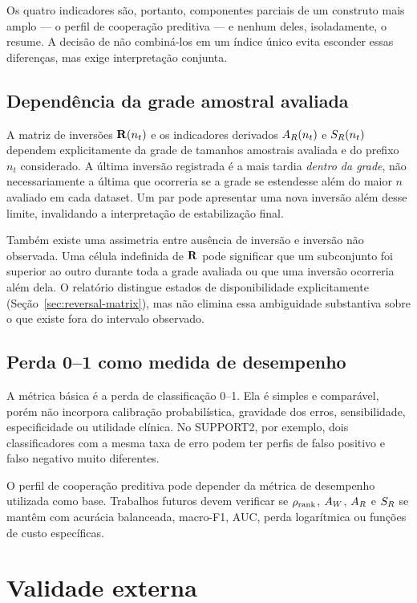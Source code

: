 Os quatro indicadores são, portanto, componentes parciais de um construto mais amplo --- o perfil de cooperação preditiva --- e nenhum deles, isoladamente, o resume. A decisão de não combiná-los em um índice único evita esconder essas diferenças, mas exige interpretação conjunta.

\subsection{Dependência da grade amostral avaliada}

A matriz de inversões $\mathbf{R}(n_t)$ e os indicadores derivados $A_R(n_t)$ e $S_R(n_t)$ dependem explicitamente da grade de tamanhos amostrais avaliada e do prefixo $n_t$ considerado. A última inversão registrada é a mais tardia \emph{dentro da grade}, não necessariamente a última que ocorreria se a grade se estendesse além do maior $n$ avaliado em cada dataset. Um par pode apresentar uma nova inversão além desse limite, invalidando a interpretação de estabilização final.

Também existe uma assimetria entre ausência de inversão e inversão não observada. Uma célula indefinida de $\mathbf{R}$ pode significar que um subconjunto foi superior ao outro durante toda a grade avaliada ou que uma inversão ocorreria além dela. O relatório distingue estados de disponibilidade explicitamente (Seção~\ref{sec:reversal-matrix}), mas não elimina essa ambiguidade substantiva sobre o que existe fora do intervalo observado.

\subsection{Perda 0--1 como medida de desempenho}

A métrica básica é a perda de classificação 0--1. Ela é simples e comparável, porém não incorpora calibração probabilística, gravidade dos erros, sensibilidade, especificidade ou utilidade clínica. No SUPPORT2, por exemplo, dois classificadores com a mesma taxa de erro podem ter perfis de falso positivo e falso negativo muito diferentes.

O perfil de cooperação preditiva pode depender da métrica de desempenho utilizada como base. Trabalhos futuros devem verificar se $\rho_{\mathrm{rank}}$, $A_W$, $A_R$ e $S_R$ se mantêm com acurácia balanceada, macro-F1, AUC, perda logarítmica ou funções de custo específicas.

\section{Validade externa}

